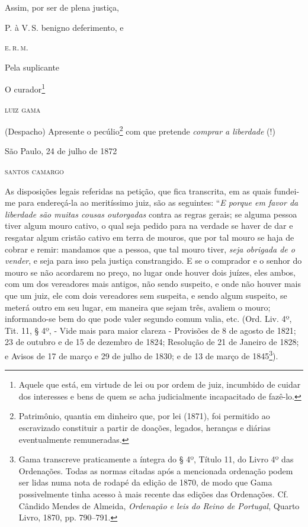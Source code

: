 \begin{flushright}
Assim, por ser de plena justiça,

P. à V.\,S. benigno deferimento, e

\textsc{e.\,r.\,m.}

Pela suplicante

O curador\footnote{ Aquele que está, em virtude de lei ou por ordem de
  juiz, incumbido de cuidar dos interesses e bens de quem se acha
  judicialmente incapacitado de fazê-lo.}

\textsc{luiz gama}
\end{flushright}

(Despacho) Apresente o pecúlio\footnote{ Patrimônio, quantia em
  dinheiro que, por lei (1871), foi permitido ao escravizado constituir
  a partir de doações, legados, heranças e diárias eventualmente
  remuneradas.} com que pretende \emph{comprar a liberdade} (!)

\begin{flushright}
São Paulo, 24 de julho de 1872

\textsc{santos camargo}
\end{flushright}

As disposições legais referidas na petição, que fica transcrita, em as
quais fundei-me para endereçá-la ao meritíssimo juiz, são as seguintes:
``\emph{E porque em favor da liberdade são muitas cousas outorgadas}
contra as regras gerais; se alguma pessoa tiver algum mouro cativo, o
qual seja pedido para na verdade se haver de dar e resgatar algum
cristão cativo em terra de mouros, que por tal mouro se haja de cobrar e
remir: mandamos que a pessoa, que tal mouro tiver, \emph{seja obrigada
de o vender}, e seja para isso pela justiça constrangido. E se o
comprador e o senhor do mouro se não acordarem no preço, no lugar onde
houver dois juízes, eles ambos, com um dos vereadores mais antigos, não
sendo suspeito, e onde não houver mais que um juiz, ele com dois
vereadores sem suspeita, e sendo algum suspeito, se meterá outro em seu
lugar, em maneira que sejam três, avaliem o mouro; informando-se bem do
que pode valer segundo comum valia, etc. (Ord. Liv. 4º, Tit. 11, § 4º, -
Vide mais para maior clareza - Provisões de 8 de agosto de 1821; 23 de
outubro e de 15 de dezembro de 1824; Resolução de 21 de Janeiro de 1828;
e Avisos de 17 de março e 29 de julho de 1830; e de 13 de março de
1845\footnote{ Gama transcreve praticamente a íntegra do § 4º, Título
  11, do Livro 4º das Ordenações. Todas as normas citadas após a
  mencionada ordenação podem ser lidas numa nota de rodapé da edição de
  1870, de modo que Gama possivelmente tinha acesso à mais recente das
  edições das Ordenações. Cf. Cândido Mendes de Almeida, \emph{Ordenação
  e leis do Reino de Portugal}, Quarto Livro, 1870, pp. 790--791.}).

